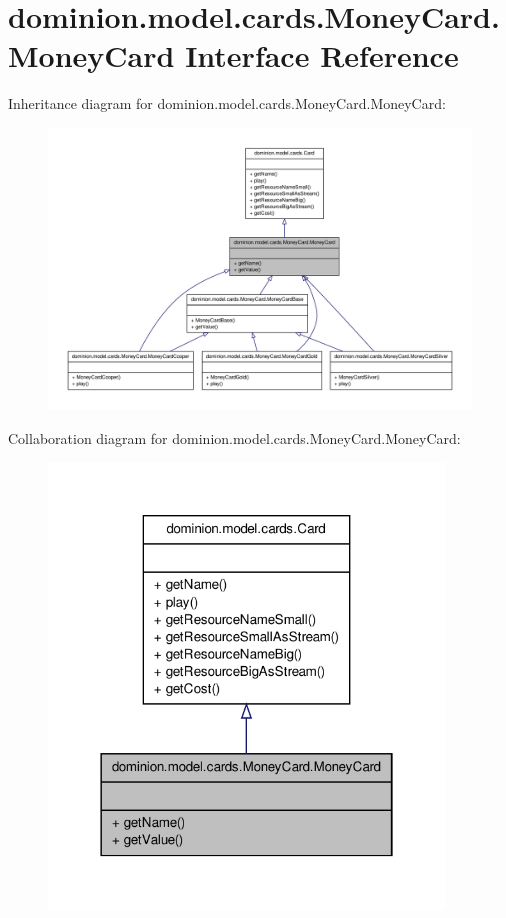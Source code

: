 \hypertarget{interfacedominion_1_1model_1_1cards_1_1MoneyCard_1_1MoneyCard}{\section{dominion.\-model.\-cards.\-Money\-Card.\-Money\-Card \-Interface \-Reference}
\label{interfacedominion_1_1model_1_1cards_1_1MoneyCard_1_1MoneyCard}
}


\-Inheritance diagram for dominion.\-model.\-cards.\-Money\-Card.\-Money\-Card\-:
\nopagebreak
\begin{figure}[H]
\begin{center}
\leavevmode
\includegraphics[width=350pt]{interfacedominion_1_1model_1_1cards_1_1MoneyCard_1_1MoneyCard__inherit__graph}
\end{center}
\end{figure}


\-Collaboration diagram for dominion.\-model.\-cards.\-Money\-Card.\-Money\-Card\-:
\nopagebreak
\begin{figure}[H]
\begin{center}
\leavevmode
\includegraphics[width=298pt]{interfacedominion_1_1model_1_1cards_1_1MoneyCard_1_1MoneyCard__coll__graph}
\end{center}
\end{figure}
